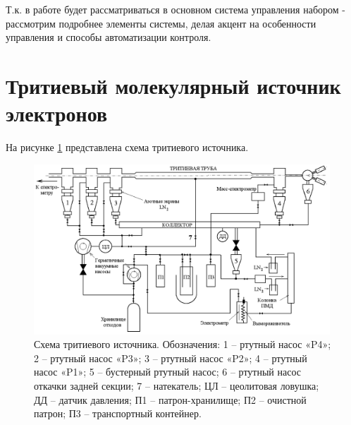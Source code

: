 \documentclass[a4paper,14pt]{extreport}
\begin{document}
Т.к. в работе будет рассматриваться в основном система управления набором - рассмотрим подробнее элементы системы, делая акцент на особенности управления и способы автоматизации контроля.

\section{Тритиевый молекулярный источник электронов}

На рисунке \ref{fig:numass-source} представлена схема тритиевого источника.

\begin{figure}
  \centering
  \includegraphics[width = 0.99\textwidth]{img/nu_mass_setup/source-control.png}
    \caption{Схема тритиевого источника. Обозначения: 1 – ртутный насос «P4»; 2 – ртутный насос «P3»; 3 – ртутный насос «P2»; 4 – ртутный насос «P1»; 5 – бустерный ртутный насос; 6 – ртутный насос откачки задней секции; 7 – натекатель; ЦЛ – цеолитовая ловушка; ДД – датчик давления; П1 – патрон-хранилище; П2 – очистной патрон; П3 – транспортный контейнер.}
    \label{fig:numass-source}
\end{figure}
\end{document}

